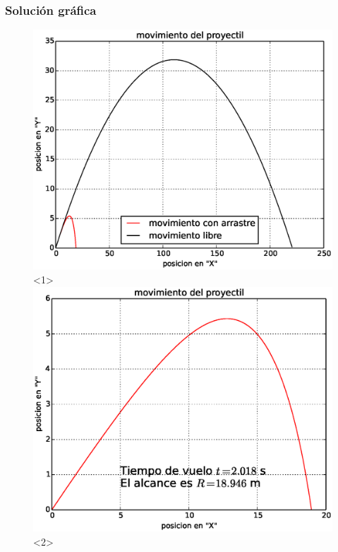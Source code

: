 \begin{frame}[fragile]
\frametitle{Solución gráfica}
\begin{figure}
	\centering
	\includegraphics[scale=0.5]{Examen3_P7_01.eps}<1>
	\includegraphics[scale=0.5]{Examen3_P7_02.eps}<2>
\end{figure}
\end{frame}
